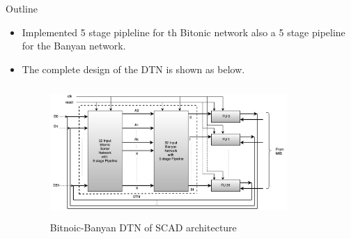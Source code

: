 \begin{frame}[allowframebreaks]{Outline}
\begin{itemize}
  \item Implemented 5 stage pipleline for th Bitonic network also a 5 stage pipeline for the Banyan network.\\
  \item The complete design of the DTN is shown as below. \\
    \begin{figure}[!ht]
    \includegraphics[width=9cm, height=5cm]{figures/Batcher_Banyan_Combined}
    \caption{Bitnoic-Banyan DTN of SCAD architecture}
  \end{figure}
  \end{itemize}
\end{frame}
